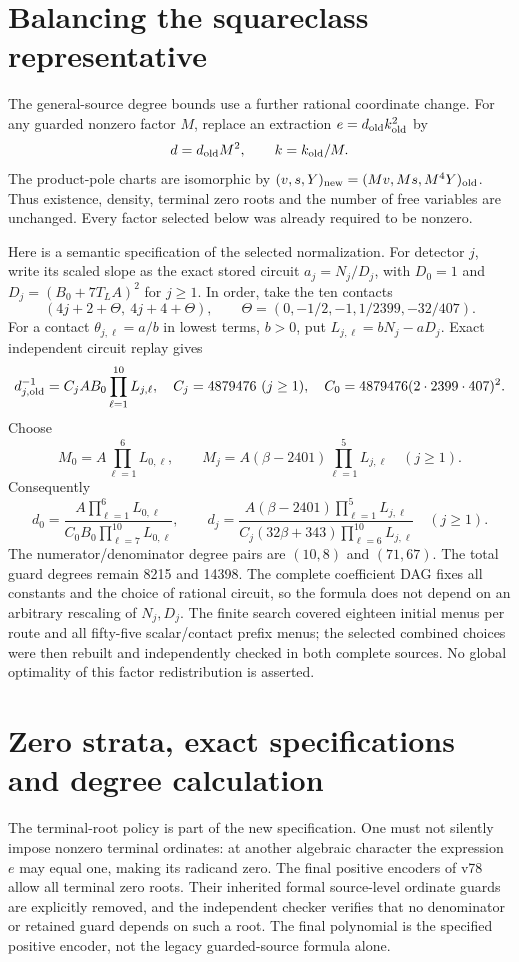 \documentclass[11pt]{article}
\begin{document}
\section{Balancing the squareclass representative}\label{sec:balanced}
The general-source degree bounds use a further rational coordinate
change. For any guarded nonzero factor $M$, replace an extraction
$e=d_{\rm old}k_{\rm old}^2$ by
\[
 d=d_{\rm old}M^2,\qquad k=k_{\rm old}/M.
\]
The product-pole charts are isomorphic by
$(v,s,Y)_{\rm new}=(Mv,Ms,M^4Y)_{\rm old}$. Thus existence, density,
terminal zero roots and the number of free variables are unchanged.
Every factor selected below was already required to be nonzero.

Here is a semantic specification of the selected normalization.
For detector $j$, write its scaled slope as the exact stored circuit
$a_j=N_j/D_j$, with $D_0=1$ and
$D_j=(B_0+7T_LA)^2$ for $j\ge1$. In order, take the ten contacts
\[
 (4j+2+\Theta,\ 4j+4+\Theta),\qquad
 \Theta=(0,-1/2,-1,1/2399,-32/407).
\]
For a contact $\theta_{j,\ell}=a/b$ in lowest terms, $b>0$, put
$L_{j,\ell}=bN_j-aD_j$. Exact independent circuit replay gives
\[
 d_{j,\rm old}^{-1}=C_jAB_0\prod_{\ell=1}^{10}L_{j,\ell},
\quad C_j=4879476\ (j\ge1),\quad
C_0=4879476(2\cdot2399\cdot407)^2.
\]
Choose
\[
 M_0=A\prod_{\ell=1}^{6}L_{0,\ell},\qquad
 M_j=A(\beta-2401)\prod_{\ell=1}^{5}L_{j,\ell}\quad(j\ge1).
\]
Consequently
\[
 d_0=\frac{A\prod_{\ell=1}^{6}L_{0,\ell}}
 {C_0B_0\prod_{\ell=7}^{10}L_{0,\ell}},\qquad
 d_j=\frac{A(\beta-2401)\prod_{\ell=1}^{5}L_{j,\ell}}
 {C_j(32\beta+343)\prod_{\ell=6}^{10}L_{j,\ell}}\quad(j\ge1).
\]
The numerator/denominator degree pairs are $(10,8)$ and $(71,67)$.
The total guard degrees remain 8215 and 14398. The complete coefficient
DAG fixes all constants and the choice of rational circuit, so the
formula does not depend on an arbitrary rescaling of $N_j,D_j$.
The finite search covered eighteen initial menus per route and all
fifty-five scalar/contact prefix menus; the selected combined choices
were then rebuilt and independently checked in both complete sources.
No global optimality of this factor redistribution is asserted.

\section{Zero strata, exact specifications and degree calculation}
The terminal-root policy is part of the new specification. One must
not silently impose nonzero terminal ordinates: at another algebraic
character the expression $e$ may equal one, making its radicand zero.
The final positive encoders of v78 allow all terminal zero roots.
Their inherited formal source-level ordinate guards are explicitly
removed, and the independent checker verifies that no denominator or
retained guard depends on such a root. The final polynomial is the
specified positive encoder, not the legacy guarded-source formula alone.
\end{document}
